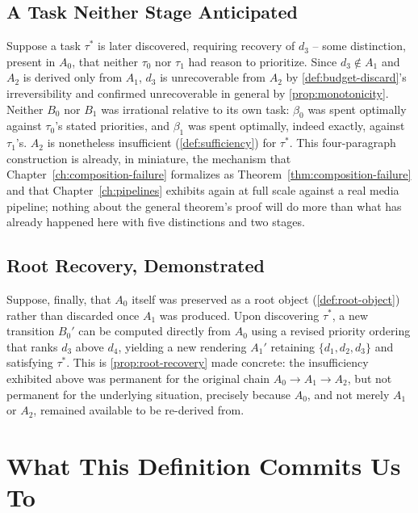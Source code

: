 \subsection{A Task Neither Stage Anticipated}

Suppose a task $\tau^*$ is later discovered, requiring recovery of $d_3$
-- some distinction, present in $A_0$, that neither $\tau_0$ nor $\tau_1$
had reason to prioritize. Since $d_3 \notin A_1$ and $A_2$ is derived only
from $A_1$, $d_3$ is unrecoverable from $A_2$ by
\cref{def:budget-discard}'s irreversibility and confirmed unrecoverable in
general by \cref{prop:monotonicity}. Neither $B_0$ nor $B_1$ was
irrational relative to its own task: $\beta_0$ was spent optimally against
$\tau_0$'s stated priorities, and $\beta_1$ was spent optimally, indeed
exactly, against $\tau_1$'s. $A_2$ is nonetheless insufficient
(\cref{def:sufficiency}) for $\tau^*$. This four-paragraph construction is
already, in miniature, the mechanism that Chapter~\ref{ch:composition-failure}
formalizes as Theorem~\ref{thm:composition-failure} and that
Chapter~\ref{ch:pipelines} exhibits again at full scale against a real
media pipeline; nothing about the general theorem's proof will do more
than what has already happened here with five distinctions and two
stages.

\subsection{Root Recovery, Demonstrated}

Suppose, finally, that $A_0$ itself was preserved as a root object
(\cref{def:root-object}) rather than discarded once $A_1$ was produced.
Upon discovering $\tau^*$, a new transition $B_0'$ can be computed directly
from $A_0$ using a revised priority ordering that ranks $d_3$ above $d_4$,
yielding a new rendering $A_1'$ retaining $\{d_1, d_2, d_3\}$ and
satisfying $\tau^*$. This is \cref{prop:root-recovery} made concrete: the
insufficiency exhibited above was permanent for the original chain
$A_0 \to A_1 \to A_2$, but not permanent for the underlying situation,
precisely because $A_0$, and not merely $A_1$ or $A_2$, remained available
to be re-derived from.

\section{What This Definition Commits Us To}

